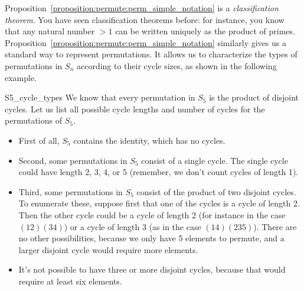Proposition~\ref{proposition:permute:perm_simple_notation} is a \emph{classification theorem}. You have seen classification theorems before: for instance, you know that any natural number $>1$ can be written uniquely as the product of primes.  Proposition~\ref{proposition:permute:perm_simple_notation} similarly gives us a standard way to represent permutations. It allows us to characterize the types of permutations in $S_n$ according to their cycle sizes, as shown in the following example.

\begin{example}{S5_cycle_types}
We know that every permutation in $S_5$ is the product of disjoint cycles. Let us list all  possible cycle lengths and number of cycles for the permutations of $S_5$.
\begin{itemize}
\item
First of all, $S_5$ contains the identity, which has no cycles.
\item
Second, some permutations in $S_5$ consist of a single cycle.  The single cycle could have length 2, 3, 4, or 5 (remember, we don't count cycles of length 1).
\item
Third, some permutations in $S_5$ consist of the product of two disjoint cycles. To enumerate these, suppose first that one of the cycles is a cycle of length 2. Then the other cycle could be a cycle of length 2 (for instance in the case $(12)(34)$) or a cycle of length 3 (as in the case $(14)(235)$). There are no other possibilities, because we only have 5 elements to permute, and a larger disjoint cycle would require more elements.
\item
It's not possible to have three or more disjoint cycles, because that would require at least six elements.
\end{itemize}



\end{example}
